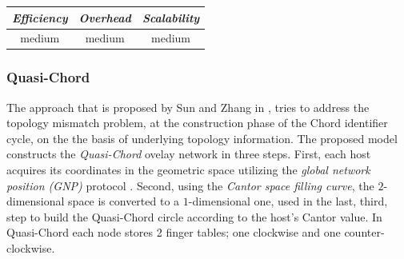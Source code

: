 \begin{center}
\begin{tabular}{ccc}
\emph{Efficiency} & \emph{Overhead} & \emph{Scalability} \\
\hline
%
medium &
%
medium &
%
medium
\end{tabular}
\end{center}

\subsubsection{Quasi-Chord}
The approach that is proposed by Sun and Zhang in \cite{sun_quasi_2008}, tries
to address the topology mismatch problem, at the construction phase of the
Chord identifier cycle, on the the basis of underlying topology information.
The proposed model constructs the \emph{Quasi-Chord} ovelay network in three
steps. First, each host acquires its coordinates in the geometric space
utilizing the \emph{global network position (GNP)} protocol \cite{ng_gnp_2001}.
Second, using the \emph{Cantor space filling curve}, the $2$-dimensional space
is converted to a $1$-dimensional one, used in the last, third, step to build
the Quasi-Chord circle according to the host's Cantor value. In Quasi-Chord
each node stores 2 finger tables; one clockwise and one counter-clockwise.

